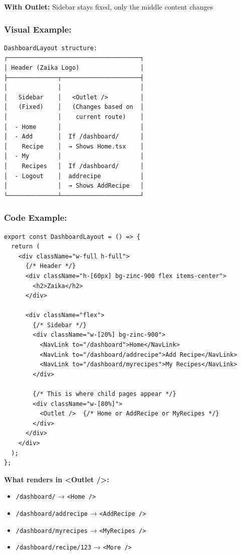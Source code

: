 \documentclass[12pt]{article}
\begin{document}
\textbf{With Outlet:} Sidebar stays fixed, only the middle content changes

\subsubsection*{Visual Example:}

\begin{lstlisting}
DashboardLayout structure:
┌─────────────────────────────────────┐
│ Header (Zaika Logo)                 │
├──────────────┬──────────────────────┤
│              │                      │
│   Sidebar    │   <Outlet />         │
│   (Fixed)    │   (Changes based on  │
│              │    current route)    │
│  - Home      │                      │
│  - Add       │  If /dashboard/      │
│    Recipe    │  → Shows Home.tsx    │
│  - My        │                      │
│    Recipes   │  If /dashboard/      │
│  - Logout    │  addrecipe           │
│              │  → Shows AddRecipe   │
└──────────────┴──────────────────────┘
\end{lstlisting}

\subsubsection*{Code Example:}

\begin{lstlisting}
export const DashboardLayout = () => {
  return (
    <div className="w-full h-full">
      {/* Header */}
      <div className="h-[60px] bg-zinc-900 flex items-center">
        <h2>Zaika</h2>
      </div>
      
      <div className="flex">
        {/* Sidebar */}
        <div className="w-[20%] bg-zinc-900">
          <NavLink to="/dashboard">Home</NavLink>
          <NavLink to="/dashboard/addrecipe">Add Recipe</NavLink>
          <NavLink to="/dashboard/myrecipes">My Recipes</NavLink>
        </div>
        
        {/* This is where child pages appear */}
        <div className="w-[80%]">
          <Outlet />  {/* Home or AddRecipe or MyRecipes */}
        </div>
      </div>
    </div>
  );
};
\end{lstlisting}

\textbf{What renders in <Outlet />:}

\begin{itemize}
    \item \texttt{/dashboard/} → \texttt{<Home />}
    \item \texttt{/dashboard/addrecipe} → \texttt{<AddRecipe />}
    \item \texttt{/dashboard/myrecipes} → \texttt{<MyRecipes />}
    \item \texttt{/dashboard/recipe/123} → \texttt{<More />}
\end{itemize}
\end{document}
